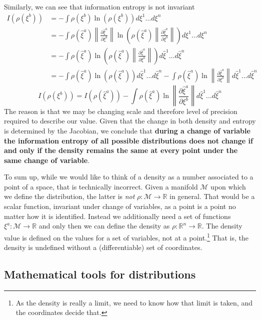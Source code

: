 \documentclass[11pt]{article}
\begin{document}
Similarly, we can see that information entropy is not invariant
\begin{align*}
I(\rho(\xi^b)) &=-\int \rho(\xi^b) \ln (\rho(\xi^b)) d\xi^1 ... d\xi^n \\
&=-\int \rho(\hat{\xi}^a) \left\|\frac{\partial \hat{\xi}^a}{\partial \xi^b}\right\| \ln \left(\rho(\hat{\xi}^a) \left\|\frac{\partial \hat{\xi}^a}{\partial \xi^b}\right\|\right) d\xi^1 ... d\xi^n \\
&=-\int \rho(\hat{\xi}^a) \ln \left(\rho(\hat{\xi}^a) \left\|\frac{\partial \hat{\xi}^a}{\partial \xi^b}\right\|\right) d\hat{\xi}^1 ... d\hat{\xi}^n \\
&=-\int \rho(\hat{\xi}^a) \ln (\rho(\hat{\xi}^a)) d\hat{\xi}^1 ... d\hat{\xi}^n -\int \rho(\hat{\xi}^a) \ln \left\|\frac{\partial \hat{\xi}^a}{\partial \xi^b}\right\| d\hat{\xi}^1 ... d\hat{\xi}^n
\end{align*}
\begin{equation}\label{entropy_transformation}
I(\rho(\xi^b)) =I(\rho(\hat{\xi}^a)) -\int \rho(\hat{\xi}^a) \ln \left\|\frac{\partial \hat{\xi}^a}{\partial \xi^b}\right\| d\hat{\xi}^1 ... d\hat{\xi}^n
\end{equation}
The reason is that we may be changing scale and therefore level of precision required to describe our value. Given that the change in both density and entropy is determined by the Jacobian, we conclude that \textbf{during a change of variable the information entropy of all possible distributions does not change if and only if the density remains the same at every point under the same change of variable}.

To sum up, while we would like to think of a density as a number associated to a point of a space, that is technically incorrect. Given a manifold $\mathcal{M}$ upon which we define the distribution, the latter is \emph{not} $\rho : \mathcal{M} \to \mathbb{R}$ in general. That would be a scalar function, invariant under change of variables, as a point is a point no matter how it is identified. Instead we additionally need a set of functions $\xi^a : \mathcal{M} \to \mathbb{R}$ and only then we can define the density as $\rho : \mathbb{R}^n \to \mathbb{R}$. The density value is defined on the values for a set of variables, not at a point.\footnote{As the density is really a limit, we need to know how that limit is taken, and the coordinates decide that.} That is, the density is undefined without a (differentiable) set of coordinates.

\subsection*{Mathematical tools for distributions}
\end{document}
